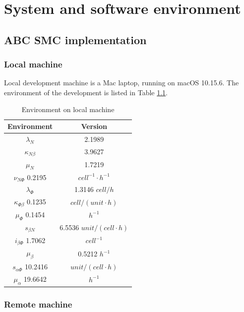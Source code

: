 \documentclass[12pt,a4paper]{report}
\begin{document}
\appendix

\chapter{System and software environment}

\section{ABC SMC implementation}

\subsection{Local machine}

Local development machine is a Mac laptop, running on macOS 10.15.6. The environment of the development is listed in Table \ref{table:local_macine}.

\begin{table}[h!]
    \centering
    \begin{tabular}{|c c|} 
     \hline
     Environment & Version \\ [0.5ex] 
     \hline\hline
     $\lambda_N$ & 2.1989  \\ 
     $\kappa_{N\beta}$ & 3.9627  \\
     $\mu_N$ & 1.7219 \\
     $\nu_{N\Phi}$  0.2195 & $cell^{-1}\cdotp h^{-1}$ \\
     \hline
     $\lambda_\Phi$ & 1.3146  $cell/h$ \\
     $\kappa_{\Phi\beta}$ 0.1235 & $cell/(unit\cdotp h)$ \\
     $\mu_\Phi$  0.1454 & $h^{-1}$ \\
     \hline
     $s_{\beta N}$ &6.5536  $unit/(cell\cdotp h)$ \\
     $i_{\beta\Phi}$  1.7062 & $cell^{-1}$ \\
     $\mu_\beta$ &0.5212  $h^{-1}$ \\
     \hline
     $s_{\alpha\Phi}$  10.2416 & $unit/(cell\cdotp h)$ \\
     $\mu_\alpha$ 19.6642 & $h^{-1}$ \\
    [1ex] 
     \hline
    \end{tabular}
    \caption{Environment on local machine}
    \label{table:local_macine}
\end{table}

\subsection{Remote machine}
\end{document}
